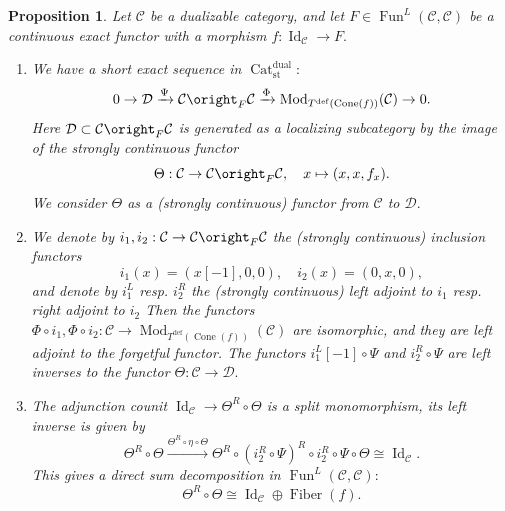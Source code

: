 \documentclass[11pt,leqno]{amsart}
\newtheorem{prop}[theo]{Proposition}
\numberwithin{equation}{section}
\newcommand{\xto}{\xrightarrow}
\newcommand{\Cat}{\operatorname{Cat}}
\newcommand{\Cone}{\operatorname{Cone}}
\newcommand{\Fiber}{\operatorname{Fiber}}
\newcommand{\st}{\operatorname{st}}
\newcommand{\dual}{\operatorname{dual}}
\newcommand{\deff}{\operatorname{def}}
\newcommand{\cD}{{\mathcal D}}
\newcommand{\cC}{{\mathcal C}}
\newcommand{\Fun}{\operatorname{Fun}}
\newcommand{\Id}{\operatorname{Id}}
\newcommand{\Mod}{\operatorname{Mod}}
\begin{document}
\begin{prop}\label{prop:ses_for_deformed}
Let $\cC$ be a dualizable category, and let $F\in\Fun^L(\cC,\cC)$ be a continuous exact functor with a morphism $f:\Id_{\cC}\to F.$ 
\begin{enumerate}[label=(\roman*),ref=(\roman*)]
	\item We have a short exact sequence in $\Cat_{\st}^{\dual}:$
	\begin{equation*}
		0\to \cD\xto{\Psi} \cC\oright_F \cC\xto{\Phi} \Mod_{T^{\deff}(\Cone(f))}(\cC)\to 0.
	\end{equation*}
	Here $\cD\subset \cC\oright_F \cC$ is generated as a localizing subcategory by the image of the strongly continuous functor
	\begin{equation}\label{eq:Theta_generating_the_kernel}
		\Theta:\cC\to \cC\oright_F \cC,\quad x\mapsto (x,x,f_x).
\end{equation}
We consider $\Theta$ as a (strongly continuous) functor from $\cC$ to $\cD.$ \label{ses_for_deformed}
\item We denote by $i_1,i_2:\cC\to \cC\oright_F \cC$ the (strongly continuous) inclusion functors
\begin{equation*}
i_1(x)=(x[-1],0,0),\quad i_2(x)=(0,x,0),
\end{equation*}
and denote by $i_1^L$ resp. $i_2^R$ the (strongly continuous) left adjoint to $i_1$ resp. right adjoint to $i_2$ Then the functors $\Phi\circ i_1,\Phi\circ i_2:\cC\to \Mod_{T^{\deff}(\Cone(f))}(\cC)$ are isomorphic, and they are left adjoint to the forgetful functor.
The functors $i_1^L[-1]\circ\Psi$ and $i_2^R\circ\Psi$ are left inverses to the functor $\Theta:\cC\to\cD.$ \label{left_inverse}
\item The adjunction counit $\Id_{\cC}\to \Theta^R\circ\Theta$ is a split monomorphism, its left inverse is given by
\begin{equation}\label{eq:left_inverse_to_counit}
\Theta^R\circ\Theta\xto{\Theta^R\circ\eta\circ\Theta} \Theta^R\circ(i_2^R\circ\Psi)^R\circ i_2^R\circ\Psi\circ\Theta\cong \Id_{\cC}.
\end{equation}
This gives a direct sum decomposition in $\Fun^L(\cC,\cC):$
\begin{equation*} \Theta^R\circ \Theta\cong \Id_{\cC}\oplus \Fiber(f).
\end{equation*} \label{counit_splits}
\end{enumerate}
\end{prop}
\end{document}
